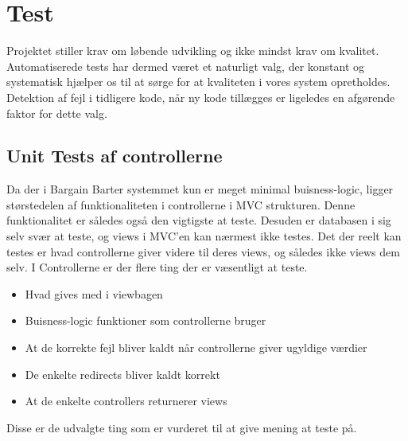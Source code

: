 \chapter{Test}

Projektet stiller krav om løbende udvikling og ikke mindst krav om kvalitet. Automatiserede tests har dermed været et naturligt valg, der konstant og systematisk hjælper os til at sørge for at kvaliteten i vores system opretholdes. Detektion af fejl i tidligere kode, når ny kode tillægges er ligeledes en afgørende faktor for dette valg.



\section{Unit Tests af controllerne}
Da der i Bargain Barter systemmet kun er meget minimal buisness-logic, ligger størstedelen af funktionaliteten i controllerne i MVC strukturen. Denne funktionalitet er således også den vigtigste at teste. Desuden er databasen i sig selv svær at teste, og views i MVC'en kan nærmest ikke testes. Det der reelt kan testes er hvad controllerne giver videre til deres views, og således ikke views dem selv. I Controllerne er der flere ting der er væsentligt at teste.
\begin{itemize}
	\item Hvad gives med i viewbagen
	\item Buisness-logic funktioner som controllerne bruger
	\item At de korrekte fejl bliver kaldt når controllerne giver ugyldige værdier
	\item De enkelte redirects bliver kaldt korrekt
	\item At de enkelte controllers returnerer views
\end{itemize}       
Disse er de udvalgte ting som er vurderet til at give mening at teste på.

